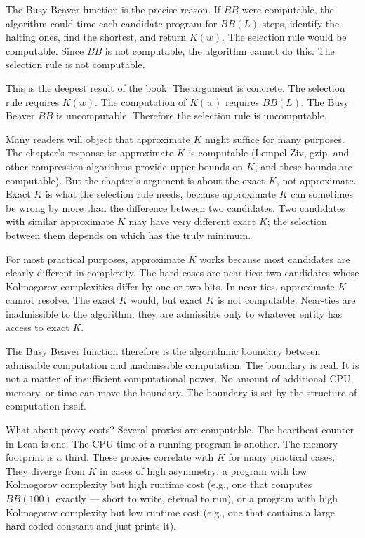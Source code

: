 The Busy Beaver function is the precise reason. If $BB$ were
computable, the algorithm could time each candidate program for
$BB(L)$ steps, identify the halting ones, find the shortest, and
return $K(w)$. The selection rule would be computable. Since $BB$
is not computable, the algorithm cannot do this. The selection rule
is not computable.

This is the deepest result of the book. The argument is concrete.
The selection rule requires $K(w)$. The computation of $K(w)$
requires $BB(L)$. The Busy Beaver $BB$ is uncomputable. Therefore
the selection rule is uncomputable.

Many readers will object that approximate $K$ might suffice for
many purposes. The chapter's response is: approximate $K$ is
computable (Lempel-Ziv, gzip, and other compression algorithms
provide upper bounds on $K$, and these bounds are computable). But
the chapter's argument is about the exact $K$, not approximate.
Exact $K$ is what the selection rule needs, because approximate $K$
can sometimes be wrong by more than the difference between two
candidates. Two candidates with similar approximate $K$ may have
very different exact $K$; the selection between them depends on
which has the truly minimum.

For most practical purposes, approximate $K$ works because most
candidates are clearly different in complexity. The hard cases are
near-ties: two candidates whose Kolmogorov complexities differ by
one or two bits. In near-ties, approximate $K$ cannot resolve. The
exact $K$ would, but exact $K$ is not computable. Near-ties are
inadmissible to the algorithm; they are admissible only to whatever
entity has access to exact $K$.

The Busy Beaver function therefore is the algorithmic boundary
between admissible computation and inadmissible computation. The
boundary is real. It is not a matter of insufficient computational
power. No amount of additional CPU, memory, or time can move the
boundary. The boundary is set by the structure of computation
itself.

What about proxy costs? Several proxies are computable. The
heartbeat counter in Lean is one. The CPU time of a running
program is another. The memory footprint is a third. These
proxies correlate with $K$ for many practical cases. They diverge
from $K$ in cases of high asymmetry: a program with low Kolmogorov
complexity but high runtime cost (e.g., one that computes $BB(100)$
exactly --- short to write, eternal to run), or a program with
high Kolmogorov complexity but low runtime cost (e.g., one that
contains a large hard-coded constant and just prints it).

